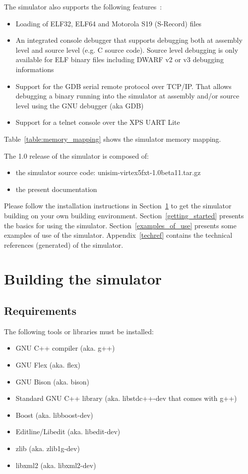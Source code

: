 \cleardoublepage

\noindent The simulator also supports the following features :
\begin{itemize}
\item Loading of ELF32, ELF64 \cite{ELF} and Motorola S19 (S-Record) \cite{S19} files
\item An integrated console debugger that supports debugging both at assembly level and source level (e.g. C source code). Source level debugging is only available for ELF binary files including DWARF v2 or v3 \cite{DWARF3} debugging informations
\item Support for the GDB \cite{GDB} serial remote protocol over TCP/IP. That allows debugging a binary running into the simulator at assembly and/or source level using the GNU debugger (aka GDB)
\item Support for a telnet console over the XPS UART Lite
\end{itemize}

Table~\ref{table:memory_mapping} shows the simulator memory mapping.

\noindent The 1.0 release of the simulator is composed of:
\begin{itemize}
\item the simulator source code: unisim-virtex5fxt-1.0beta11.tar.gz
\item the present documentation
\end{itemize}

Please follow the installation instructions in Section~\ref{building_simulator} to get the simulator building on your own building environment.
Section~\ref{getting_started} presents the basics for using the simulator.
Section~\ref{examples_of_use} presents some examples of use of the simulator.
Appendix~\ref{techref} contains the technical references (generated) of the simulator.

\section{Building the simulator}
\label{building_simulator}

\subsection{Requirements}

\noindent The following tools or libraries must be installed:
\begin{itemize}
\item GNU C++ compiler (aka. g++)
\item GNU Flex (aka. flex)
\item GNU Bison (aka. bison)
\item Standard GNU C++ library (aka. libstdc++-dev that comes with g++)
\item Boost (aka. libboost-dev)
\item Editline/Libedit (aka. libedit-dev)
\item zlib (aka. zlib1g-dev)
\item libxml2 (aka. libxml2-dev)
\end{itemize}

